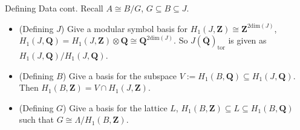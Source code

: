 \documentclass{beamer}
\newcommand{\QQ}{\mathbf{Q}}
\newcommand{\QQbar}{\overline{\mathbf{Q}}}
\newcommand{\ZZ}{\mathbf{Z}}
\renewcommand{\ZZ}{\mathbf{Z}}
\newcommand{\tor}{\mathrm{tor}}
\begin{document}



\begin{frame}{Defining Data cont.}
    Recall $A\cong B/G$, $G\subseteq B \subseteq J$.
    \begin{itemize}
        \item
            (Defining $J$) Give a modular symbol basis for $H_1(J, \ZZ)\cong
            \ZZ^{2\mathrm{dim}(J)}$, $H_1(J, \QQ) = H_1(J, \ZZ)\otimes
            \QQ\cong \QQ^{2\mathrm{dim}(J)}$. So $J(\QQbar)_\tor$ is given as
            $H_1(J, \QQ)/H_1(J, \QQ)$.
        \item
            (Defining $B$) Give a basis for the subspace $V:=H_1(B,
            \QQ)\subseteq H_1(J, \QQ)$. Then $H_1(B, \ZZ)=V\cap H_1(J, \ZZ)$.
        \item
            (Defining $G$) Give a basis for the lattice $L$, $H_1(B, \ZZ)
            \subseteq L \subseteq H_1(B, \QQ)$ such that $G\cong \Lambda/H_1(B,
            \ZZ)$.
    \end{itemize}
\end{frame}
\end{document}
